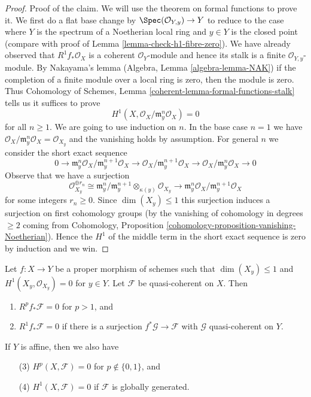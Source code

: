 \begin{proof}
\medskip\noindent
Proof of the claim. We will use the theorem on formal functions to
prove it. We first do a flat base change by $\Spec(\mathcal{O}_{Y, y}) \to Y$
to reduce to the case where $Y$ is the spectrum of a Noetherian local
ring and $y \in Y$ is the closed point (compare with proof of
Lemma \ref{lemma-check-h1-fibre-zero}).
We have already observed that $R^1f_*\mathcal{O}_X$ is a coherent
$\mathcal{O}_Y$-module and hence its stalk is a finite
$\mathcal{O}_{Y, y}$-module. By Nakayama's lemma
(Algebra, Lemma \ref{algebra-lemma-NAK})
if the completion of a finite module over a local ring
is zero, then the module is zero. Thus
Cohomology of Schemes, Lemma \ref{coherent-lemma-formal-functions-stalk}
tells us it suffices to prove
$$
H^1(X, \mathcal{O}_X/\mathfrak m_y^n \mathcal{O}_X) = 0
$$
for all $n \geq 1$. We are going to use induction on $n$.
In the base case $n = 1$ we have
$\mathcal{O}_X/\mathfrak m_y^n \mathcal{O}_X = \mathcal{O}_{X_y}$
and the vanishing holds by assumption.
For general $n$ we consider the short exact sequence
$$
0 \to \mathfrak m_y^n\mathcal{O}_X/\mathfrak m_y^{n + 1}\mathcal{O}_X
\to \mathcal{O}_X/\mathfrak m_y^{n + 1}\mathcal{O}_X \to
\mathcal{O}_X/\mathfrak m_y^n \mathcal{O}_X \to 0
$$
Observe that we have a surjection
$$
\mathcal{O}_{X_y}^{\oplus r_n} \cong
\mathfrak m_y^n/\mathfrak m_y^{n + 1} \otimes_{\kappa(y)} \mathcal{O}_{X_y}
\longrightarrow
\mathfrak m_y^n\mathcal{O}_X/\mathfrak m_y^{n + 1}\mathcal{O}_X
$$
for some integers $r_n \geq 0$.
Since $\dim(X_y) \leq 1$ this surjection induces a surjection
on first cohomology groups (by the vanishing of cohomology in degrees $\geq 2$
coming from Cohomology, Proposition
\ref{cohomology-proposition-vanishing-Noetherian}).
Hence the $H^1$ of the middle term in the short exact sequence is zero
by induction and we win.
\end{proof}

\begin{lemma}
\label{lemma-globally-generated-vanishing}
Let $f : X \to Y$ be a proper morphism of schemes such
that $\dim(X_y) \leq 1$ and $H^1(X_y, \mathcal{O}_{X_y}) = 0$
for $y \in Y$. Let $\mathcal{F}$ be quasi-coherent on $X$. Then
\begin{enumerate}
\item $R^pf_*\mathcal{F} = 0$ for $p > 1$, and
\item $R^1f_*\mathcal{F} = 0$ if there is a surjection
$f^*\mathcal{G} \to \mathcal{F}$ with $\mathcal{G}$ quasi-coherent
on $Y$.
\end{enumerate}
If $Y$ is affine, then we also have
\begin{enumerate}
\item[(3)] $H^p(X, \mathcal{F}) = 0$ for $p \not \in \{0, 1\}$, and
\item[(4)] $H^1(X, \mathcal{F}) = 0$ if $\mathcal{F}$ is globally generated.
\end{enumerate}
\end{lemma}

